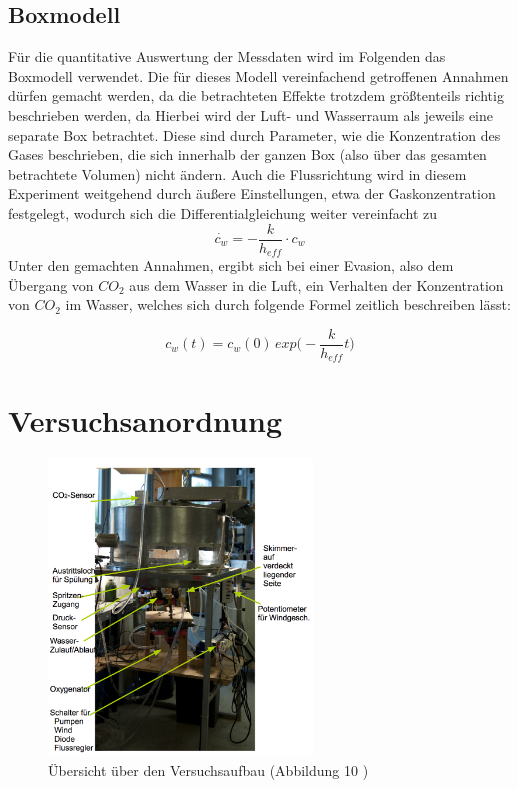 \documentclass[12pt]{article}
\begin{document}
\subsection{Boxmodell}
Für die quantitative Auswertung der Messdaten wird im Folgenden das Boxmodell verwendet. Die für dieses Modell vereinfachend getroffenen Annahmen dürfen gemacht werden, da die betrachteten Effekte trotzdem größtenteils richtig beschrieben werden, da  Hierbei wird der Luft- und Wasserraum als jeweils eine separate Box betrachtet. Diese sind durch Parameter, wie die Konzentration des Gases beschrieben, die sich innerhalb der ganzen Box (also über das gesamten betrachtete Volumen) nicht ändern. 
Auch die Flussrichtung wird in diesem Experiment weitgehend durch äußere Einstellungen, etwa der Gaskonzentration festgelegt, wodurch sich die Differentialgleichung weiter vereinfacht zu
\begin{equation}
	\dot{c_w} = - \frac{k}{h_{eff}} \cdot c_w
\end{equation}
Unter den gemachten Annahmen, ergibt sich bei einer Evasion, also dem Übergang von $CO_2$ aus dem Wasser in die Luft, ein Verhalten der Konzentration von $CO_2$ im Wasser, welches sich durch folgende Formel zeitlich beschreiben lässt:

\begin{equation}
c_w(t) = c_w(0) \, exp\Big(- \frac{k}{h_{eff}}t\Big)
\end{equation}








\section{Versuchsanordnung}

\begin{figure}[H]
	\centering
	\includegraphics[width=70mm]{Versuchsaufbau}
	\caption{Übersicht über den Versuchsaufbau (Abbildung 10 \cite{jaehne})}
\end{figure}
\end{document}
